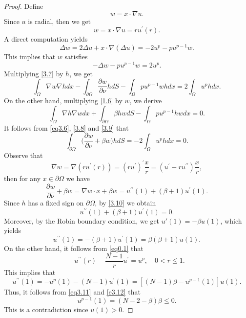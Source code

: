 \documentclass[10pt,a4paper]{amsart}
\def\R{{\mathfrak R}}
\begin{document}
\begin{proof}
Define 
$$
w=x\cdot\nabla u.
$$
Since $u$ is radial, then we get 
$$
w=x\cdot \nabla u=ru^\prime(r).
$$
A direct computation yields 
$$
\Delta w=2\Delta u+x\cdot \nabla (\Delta u)=-2u^p-pu^{p-1}w.
$$
This implies that $w$ satisfies 
\begin{equation}\label{3.7}
-\Delta w-pu^{p-1}w=2u^p.
\end{equation}
Multiplying \eqref{3.7} by $h$, we get
\begin{equation}\label{3.8}
\int_{\Omega}\nabla w\nabla hdx-\int_{\partial\Omega}\frac{\partial w}{\partial\nu}hdS-\int_{\Omega}pu^{p-1}whdx=2\int_{\Omega}u^phdx.
\end{equation}
On the other hand, multiplying \eqref{1.6} by $w$, we derive 
\begin{equation}\label{3.9}
\int_{\Omega}\nabla h\nabla wdx+\int_{\partial\Omega}\beta hwdS-\int_{\Omega}pu^{p-1}hwdx=0.
\end{equation}
It follows from \eqref{eq3.6}, \eqref{3.8} and \eqref{3.9} that 
\begin{equation}\label{3.10}
\int_{\partial\Omega}\Big(\frac{\partial w}{\partial\nu}+\beta w\Big)hdS=-2\int_{\Omega}u^phdx=0.
\end{equation}
Observe that 
$$
\nabla w=\nabla (ru^\prime(r))=(ru^\prime)^\prime\frac{x}{r}=(u^\prime+ru^{\prime\prime})\frac{x}{r},
$$
then for any $x\in\partial\Omega$ we have 
$$
\frac{\partial w}{\partial\nu}+\beta w=\nabla w\cdot x+\beta w=u^{\prime\prime}(1)+(\beta+1)u^\prime(1).
$$
Since $h$ has a fixed sign on $\partial\Omega$, by \eqref{3.10} we obtain  
\begin{equation*}
u^{\prime\prime}(1)+(\beta+1)u^\prime(1)=0.
\end{equation*}
Moreover, by the Robin boundary condition, we get $u'(1) = -\beta u(1)$, which yields 
\begin{equation}\label{eq3.11}
u^{\prime\prime}(1)=-(\beta+1)u^\prime(1)=\beta(\beta+1)u(1).
\end{equation}
On the other hand, it follows from \eqref{eq0.1} that 
$$
-u^{\prime\prime}(r)-\frac{N-1}{r}u^\prime=u^p,\quad 0<r\le 1.
$$
This implies that 
\begin{equation}\label{e3.12}
u^{\prime\prime}(1)=-u^p(1)-(N-1)u^\prime(1)=[(N-1)\beta-u^{p-1}(1)]u(1).
\end{equation}
Thus, it follows from \eqref{eq3.11} and \eqref{e3.12} that 
$$
u^{p-1}(1)=(N-2-\beta)\beta\le0.
$$
This is a contradiction since $u(1)>0$. 
\end{proof}
\end{document}
